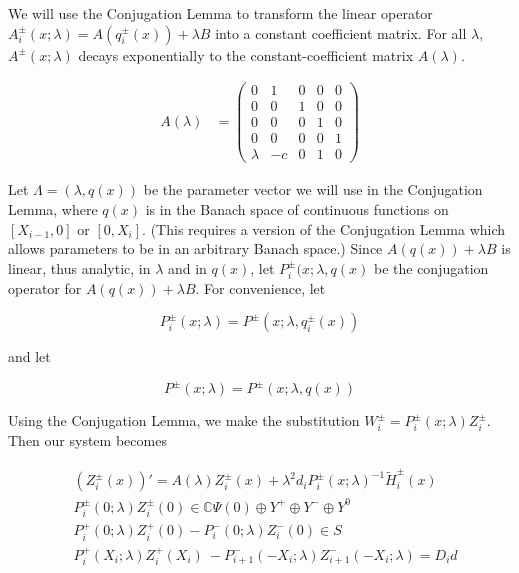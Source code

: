 \documentclass[12pt]{article}
\def\C{{\mathbb C}}
\begin{document}
We will use the Conjugation Lemma to transform the linear operator $A_i^\pm(x; \lambda) = A( q_i^\pm(x) ) + \lambda B$ into a constant coefficient matrix. For all $\lambda$, $A^\pm(x; \lambda)$ decays exponentially to the constant-coefficient matrix $A(\lambda)$. 

\begin{align}\label{Alambda}
A(\lambda) &= \begin{pmatrix}0 & 1 & 0 & 0 & 0 \\0 & 0 & 1 & 0 & 0 \\0 & 0 & 0 & 1 & 0 \\0 & 0 & 0 & 0 & 1 \\
\lambda & -c & 0 & 1 & 0 \end{pmatrix}
\end{align}

Let $\Lambda = (\lambda, q(x))$ be the parameter vector we will use in the Conjugation Lemma, where $q(x)$ is in the Banach space of continuous functions on $[X_{i-1}, 0]$ or $[0, X_i]$. (This requires a version of the Conjugation Lemma which allows parameters to be in an arbitrary Banach space.) Since 
$A( q(x) ) + \lambda B$ is linear, thus analytic, in $\lambda$ and in $q(x)$, let $P_i^\pm(x; \lambda, q(x)$ be the conjugation operator for $A( q(x) ) + \lambda B$. For convenience, let  

\begin{equation}
P_i^\pm(x; \lambda) = P^\pm(x; \lambda, q_i^\pm(x) )
\end{equation}

and let

\begin{equation}
P^\pm(x; \lambda) = P^\pm(x; \lambda, q(x) )
\end{equation}

Using the Conjugation Lemma, we make the substitution $W_i^\pm = P_i^\pm(x; \lambda) Z_i^\pm$. Then our system becomes

\begin{align*}
&(Z_i^\pm(x))' = A(\lambda) Z_i^\pm(x) + \lambda^2 d_i P_i^\pm(x; \lambda)^{-1} \tilde{H}_i^\pm(x) \\
&P_i^\pm(0; \lambda) Z_i^\pm(0) \in \C \Psi(0) \oplus Y^+ \oplus Y^- \oplus Y^0 \\
&P_i^+(0; \lambda) Z_i^+(0) - P_i^-(0; \lambda) Z_i^-(0) \in S  \\
&P_i^+(X_i; \lambda) Z_i^+(X_i)\ - P_{i+1}^-(-X_i; \lambda) Z_{i+1}^-(-X_i; \lambda) = D_i d
\end{align*}
\end{document}

